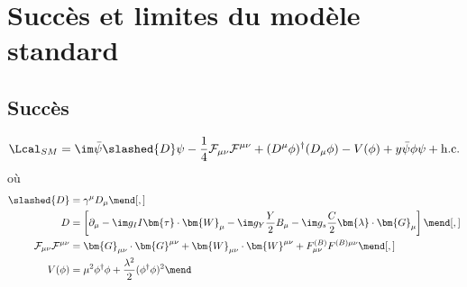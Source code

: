 \section{Succès et limites du modèle standard}\label{chapter-MS-MSSM-section-succes_limites}
\subsection{Succès}\label{chapter-MS-MSSM-section-succes_limites-subsec-succes}

\begin{equation}
\Lcal_{SM} = 
\im \bar{\psi} \slashed{D} \psi
- \frac{1}{4} \mathcal{F}_{\mu\nu}\mathcal{F}^{\mu\nu}
+ (D^\mu\phi)^\dagger(D_\mu\phi) - V(\phi)
+ y \bar{\psi}\phi\psi + \text{h.c.}
\end{equation}
où
\begin{align}
\slashed{D} &= \gamma^\mu D_\mu
\mend[,]\\
D &= \left[ \partial_\mu - \im g_I I \bm{\tau}\cdot\bm{W}_\mu - \im g_Y \frac{Y}{2} B_\mu - \im g_s \frac{C}{2} \bm{\lambda}\cdot\bm{G}_\mu \right]
\mend[,]\\
\mathcal{F}_{\mu\nu}\mathcal{F}^{\mu\nu} &= \bm{G}_{\mu\nu} \cdot \bm{G}^{\mu\nu} + \bm{W}_{\mu\nu} \cdot \bm{W}^{\mu\nu} + F^{(B)}_{\mu\nu} F^{(B)\mu\nu}
\mend[,]\\
V(\phi) &= \mu^2\phi^\dagger\phi + \frac{\lambda^2}{2} (\phi^\dagger\phi)^2
\mend
\end{align}


